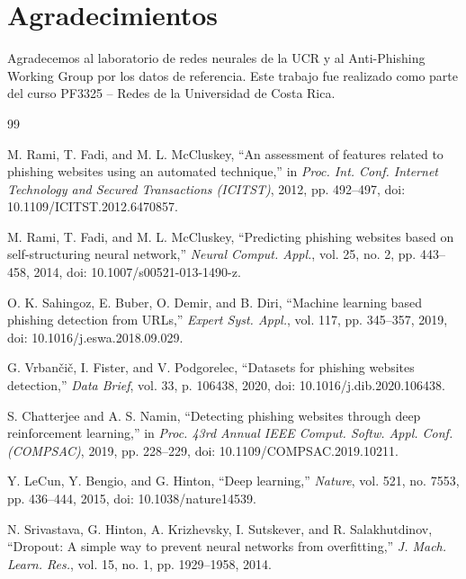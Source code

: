 \documentclass[conference]{IEEEtran}
\begin{document}
\section*{Agradecimientos}
Agradecemos al laboratorio de redes neurales de la UCR y al Anti-Phishing Working Group por los datos de referencia. Este trabajo fue realizado como parte del curso PF3325 -- Redes de la Universidad de Costa Rica.

\begin{thebibliography}{99}

M. Rami, T. Fadi, and M. L. McCluskey, ``An assessment of features related to phishing websites using an automated technique,'' in \textit{Proc. Int. Conf. Internet Technology and Secured Transactions (ICITST)}, 2012, pp. 492--497, doi: 10.1109/ICITST.2012.6470857.

M. Rami, T. Fadi, and M. L. McCluskey, ``Predicting phishing websites based on self-structuring neural network,'' \textit{Neural Comput. Appl.}, vol. 25, no. 2, pp. 443--458, 2014, doi: 10.1007/s00521-013-1490-z.

O. K. Sahingoz, E. Buber, O. Demir, and B. Diri, ``Machine learning based phishing detection from URLs,'' \textit{Expert Syst. Appl.}, vol. 117, pp. 345--357, 2019, doi: 10.1016/j.eswa.2018.09.029.

G. Vrban\v{c}i\v{c}, I. Fister, and V. Podgorelec, ``Datasets for phishing websites detection,'' \textit{Data Brief}, vol. 33, p. 106438, 2020, doi: 10.1016/j.dib.2020.106438.

S. Chatterjee and A. S. Namin, ``Detecting phishing websites through deep reinforcement learning,'' in \textit{Proc. 43rd Annual IEEE Comput. Softw. Appl. Conf. (COMPSAC)}, 2019, pp. 228--229, doi: 10.1109/COMPSAC.2019.10211.

Y. LeCun, Y. Bengio, and G. Hinton, ``Deep learning,'' \textit{Nature}, vol. 521, no. 7553, pp. 436--444, 2015, doi: 10.1038/nature14539.

N. Srivastava, G. Hinton, A. Krizhevsky, I. Sutskever, and R. Salakhutdinov, ``Dropout: A simple way to prevent neural networks from overfitting,'' \textit{J. Mach. Learn. Res.}, vol. 15, no. 1, pp. 1929--1958, 2014.


\end{thebibliography}
\end{document}

